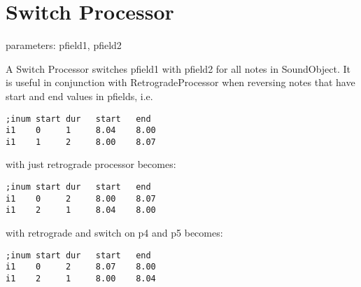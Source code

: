 \section{Switch Processor}\label{switchProcessor}

parameters: pfield1, pfield2

A Switch Processor switches pfield1 with pfield2 for all notes in
SoundObject. It is useful in conjunction with RetrogradeProcessor when
reversing notes that have start and end values in pfields, i.e.

\begin{verbatim}
;inum start dur   start   end
i1    0     1     8.04    8.00
i1    1     2     8.00    8.07
\end{verbatim}

with just retrograde processor becomes:

\begin{verbatim}
;inum start dur   start   end
i1    0     2     8.00    8.07
i1    2     1     8.04    8.00
\end{verbatim}

with retrograde and switch on p4 and p5 becomes:

\begin{verbatim}
;inum start dur   start   end
i1    0     2     8.07    8.00
i1    2     1     8.00    8.04
\end{verbatim}

